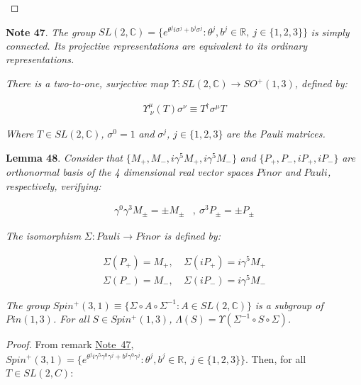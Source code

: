 \documentclass[11pt]{book}
\begin{document}
~◻

\textbf{Note 47}. \emph{The group }\(SL(2,\mathbb{C})=\{e^{\theta^j
  i\sigma^j+b^j\sigma^j}: \theta^j,b^j\in
\mathbb{R},\ j\in\{1,2,3\}\}\)\emph{ is simply connected. Its projective
representations are equivalent to its ordinary
representations}\cite{Weinberg1995quantum}\emph{.}

\emph{There is a two-to-one, surjective map
}\(\Upsilon:SL(2,\mathbb{C})\to
SO^+(1,3)\)\emph{, defined by: }

\begin{equation}\begin{aligned}
\Upsilon^{\mu}_{\ \nu}(T)\sigma^\nu\equiv T^\dagger \sigma^\mu T\end{aligned}\end{equation}

\emph{ Where }\(T\in SL(2,\mathbb{C})\)\emph{, }\(\sigma^0=1\)\emph{ and
}\(\sigma^j\)\emph{, }\(j\in\{1,2,3\}\)\emph{ are the Pauli matrices.}

\textbf{Lemma 48}. \emph{Consider that
}\(\{M_+,M_-,i\gamma^5 M_+,i\gamma^5 M_-\}\)\emph{ and
}\(\{P_+,P_-,iP_+,iP_-\}\)\emph{ are orthonormal basis of the 4
dimensional real vector spaces }\(Pinor\)\emph{ and }\(Pauli\)\emph{,
respectively, verifying: }

\begin{equation}\begin{aligned}
\gamma^0\gamma^3 M_\pm=\pm M_\pm&,\ \sigma^3 P_\pm=\pm P_\pm\end{aligned}\end{equation}

\emph{ The isomorphism }\(\Sigma:Pauli \to Pinor\)\emph{ is defined by:
}

\begin{equation}\begin{aligned}
\Sigma(P_+)=M_+,&\ \Sigma(iP_+)=i\gamma^5 M_+\\
\Sigma(P_-)=M_-,&\ \Sigma(iP_-)=i\gamma^5 M_-\end{aligned}\end{equation}

\emph{The group
}\(Spin^+(3,1)\equiv \{\Sigma\circ A \circ \Sigma^{-1}:A\in
SL(2,\mathbb{C})\}\)\emph{ is a subgroup of }\(Pin(1,3)\)\emph{. For all
}\(S\in Spin^+(1,3)\)\emph{,
}\(\Lambda(S)=\Upsilon(\Sigma^{-1}\circ S \circ \Sigma)\)\emph{.}

\emph{Proof.} From remark
\protect\hyperlink{rem:SLux282ux2cCux29}{Note~47},
\(Spin^+(3,1)=\{e^{\theta^j
  i\gamma^5\gamma^0\gamma^j+b^j\gamma^0\gamma^j}: \theta^j,b^j\in
\mathbb{R},\ j\in\{1,2,3\}\}\). Then, for all \(T\in SL(2,C)\):
\end{document}
